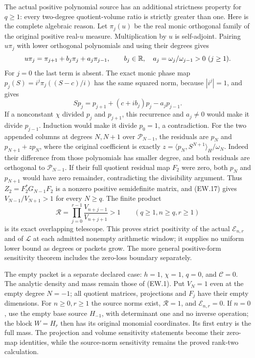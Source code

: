 The actual positive polynomial source has an additional strictness
property for $q\ge1$: every two-degree quotient-volume ratio is
strictly greater than one. Here is the complete algebraic reason.
Let $\pi_j(u)$ be the real monic orthogonal family of the original
positive real-$u$ measure. Multiplication by $u$ is self-adjoint.
Pairing $u\pi_j$ with lower orthogonal polynomials and using their
degrees gives
\[
 u\pi_j=\pi_{j+1}+b_j\pi_j+a_j\pi_{j-1},\qquad
 b_j\in\mathbb{R},\quad a_j=\omega_j/\omega_{j-1}>0\ (j\ge1).
\]
For $j=0$ the last term is absent. The exact monic phase map
$p_j(S)=i^j\pi_j((S-c)/i)$ has the same squared norm, because
$|i^j|=1$, and gives
\[
 S p_j=p_{j+1}+(c+ib_j)p_j-a_jp_{j-1}. 
\]
If a nonconstant $\chi$ divided $p_j$ and $p_{j+1}$, this
recurrence and $a_j\ne0$ would make it divide $p_{j-1}$.
Induction would make it divide $p_0=1$, a contradiction.
For the two appended columns at degrees $N,N+1$ over
$\mathcal P_{N-1}$, the residuals are $p_N$ and
$p_{N+1}+z p_N$, where the original coefficient is exactly
$z=\langle p_N,S^{N+1}\rangle_H/\omega_N$.
Indeed their difference from those polynomials has smaller degree,
and both residuals are orthogonal to $\mathcal P_{N-1}$.
If their full quotient residual map $F_2$ were zero, both $p_N$
and $p_{N+1}$ would have zero remainder, contradicting the
divisibility argument. Thus $Z_2=F_2^*G_{N-1}F_2$ is a
nonzero positive semidefinite matrix, and (EW.17) gives
$V_{N-1}/V_{N+1}>1$ for every $N\ge q$.
The finite product
\[
 \mathscr R=\prod_{j=0}^{r-1}
                  \frac{V_{n+j-1}}{V_{n+j+1}}>1
 \qquad(q\ge1,n\ge q,r\ge1)                                \tag{EW.46a}
\]
is its exact overlapping telescope. This proves strict positivity
of the actual $\mathcal E_{n,r}$ and of $\mathscr L$ at each
admitted nonempty arithmetic window; it supplies no uniform lower
bound as degrees or packets grow. The more general positive-form
sensitivity theorem includes the zero-loss boundary separately.

The empty packet is a separate declared case: $h=1$, $\chi=1$,
$q=0$, and $\mathcal C=0$. The analytic density and mass remain
those of (EW.1). Put $V_N=1$ even at the empty degree $N=-1$;
all quotient matrices, projections and $F_j$ have their empty
dimensions. For $n\ge0,r\ge1$ the source norms exist,
$\mathscr R=1$, and $\mathcal E_{n,r}=0$. If $n=0$, use the
empty base source $H_{-1}$, with determinant one and no inverse
operation; the block $W=H_r$ then has its original monomial
coordinates. Its first entry is the full mass. The projection and
volume sensitivity statements become their zero-map identities,
while the source-norm sensitivity remains the proved rank-two
calculation.

